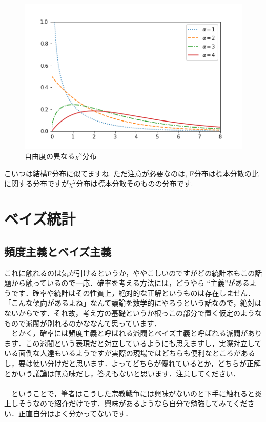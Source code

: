 \documentclass[11pt,a4paper]{jsarticle}                    %
\begin{document}
\begin{figure}[H]
\label{im:chi}
  \centering
  \includegraphics[width=120mm,bb=0 0 432 288]{../figures/kai.png}
  \caption{自由度の異なる$\chi^2$分布}
\end{figure}
 こいつは結構F分布に似てますね. ただ注意が必要なのは, F分布は標本分散の比に関する分布ですが$\chi^2$分布は標本分散そのものの分布です.

\newpage
\section{ベイズ統計}
\subsection{頻度主義とベイズ主義}
これに触れるのは気が引けるというか，ややこしいのですがどの統計本もこの話題から触っているので一応．確率を考える方法には，どうやら ``主義''があるようです．確率や統計はその性質上，絶対的な正解というものは存在しません．「こんな傾向があるよね」なんて議論を数学的にやろうという話なので，絶対はないからです．それ故，考え方の基礎というか根っこの部分で置く仮定のようなもので派閥が別れるのかななんて思っています．\\
　とかく，確率には頻度主義と呼ばれる派閥とベイズ主義と呼ばれる派閥があります．この派閥という表現だと対立しているようにも思えますし，実際対立している面倒な人達もいるようですが実際の現場ではどちらも便利なところがあるし，要は使い分けだと思います．よってどちらが優れているとか，どちらが正解とかいう議論は無意味だし，答えもないと思います．注意してください．\\
\\
　ということで，筆者はこうした宗教戦争には興味がないのと下手に触れると炎上しそうなので紹介だけです．興味があるようなら自分で勉強してみてください．正直自分はよく分かってないです．
\end{document}
